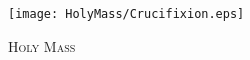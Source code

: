 \fancyhead[RE,LO]{}\fancyhead[RO,LE]{}
\fancyhead[C]{}\thispagestyle{empty}
{}

\begin{figure}[H]
    \centering
    \texttt{[image: HolyMass/Crucifixion.eps]}
    \caption{\textsc{\Huge{Holy Mass}}}
\end{figure}